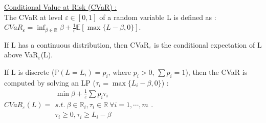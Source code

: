 \documentclass[../main.tex]{subfiles}
\begin{document}
\quad \underline{Conditional Value at Risk (CVaR) :}\\
The CVaR at level $\varepsilon \in [0,1]$ of a random variable L is defined as : $CVaR_\varepsilon = \inf_{\beta\in \mathbb{R}} \beta + \frac{1}{\varepsilon} \mathbb{E}[\max\{L-\beta,0\}]$.\\
\begin{theorem}
    If L has a continuous distribution, then CVaR${}_\varepsilon$ is the conditional expectation of L above VaR${}_\varepsilon$(L). 
\end{theorem}
\warning If L is discrete ($\mathbb{P}(L=L_i) = p_i$, where $p_i > 0$, $\sum p_i=1$), then the CVaR is computed by solving an LP ($\tau_i = \max\{L_i-\beta,0\}$) : $CVaR_\varepsilon(L) = \begin{matrix}
    \min \beta + \frac{1}{\varepsilon} \sum p_i\tau_i\\
    s.t.\: \beta \in \mathbb{R}_i, \tau_i \in \mathbb{R} \: \forall i=1,\cdots, m\\
    \tau_i\geq 0, \tau_i \geq L_i-\beta\\
\end{matrix}$. 
\end{document}
